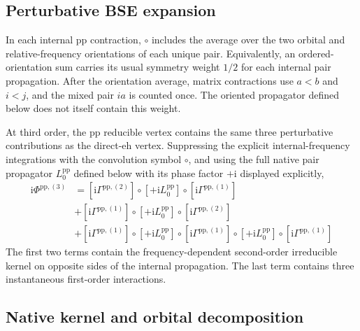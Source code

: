 \documentclass[aip,jcp,reprint,noshowkeys,superscriptaddress]{revtex4-1}
\newcommand{\ii}{\mathrm{i}}
\newcommand{\eh}{\text{eh}}
\newcommand{\pp}{\text{pp}}
\begin{document}
\subsection{Perturbative BSE expansion}

In each internal $\pp$ contraction, $\circ$ includes the average over the
two orbital and relative-frequency orientations of each unique pair.
Equivalently, an ordered-orientation sum carries its usual symmetry weight
$1/2$ for each internal pair propagation.
After the orientation average, matrix contractions use $a<b$ and $i<j$,
and the mixed pair $ia$ is counted once.
The oriented propagator defined below does not itself contain this weight.

At third order, the $\pp$ reducible vertex contains the same three
perturbative contributions as the direct-$\eh$ vertex.
Suppressing the explicit internal-frequency integrations with the convolution
symbol $\circ$, and using the full native pair propagator
$L_0^\pp$ defined below with its phase factor $+\ii$ displayed explicitly,
\begin{equation}
    \begin{split}
    \ii\Phi^{\pp,(3)}
    & =
    \left[\ii\Gamma^{\pp,(2)}\right]
    \circ\left[+\ii L_0^\pp\right]
    \circ\left[\ii\Gamma^{\pp,(1)}\right]
    \\
    &+
    \left[\ii\Gamma^{\pp,(1)}\right]
    \circ\left[+\ii L_0^\pp\right]
    \circ\left[\ii\Gamma^{\pp,(2)}\right]
    \\
    &+
    \left[\ii\Gamma^{\pp,(1)}\right]
    \circ\left[+\ii L_0^\pp\right]
    \circ\left[\ii\Gamma^{\pp,(1)}\right]
    \circ\left[+\ii L_0^\pp\right]
    \circ\left[\ii\Gamma^{\pp,(1)}\right]
    \end{split}
    \label{eq:Phi_pp_third_convolution}
\end{equation}
The first two terms contain the frequency-dependent second-order irreducible
kernel on opposite sides of the internal propagation.
The last term contains three instantaneous first-order interactions.

\subsection{Native kernel and orbital decomposition}
\end{document}
